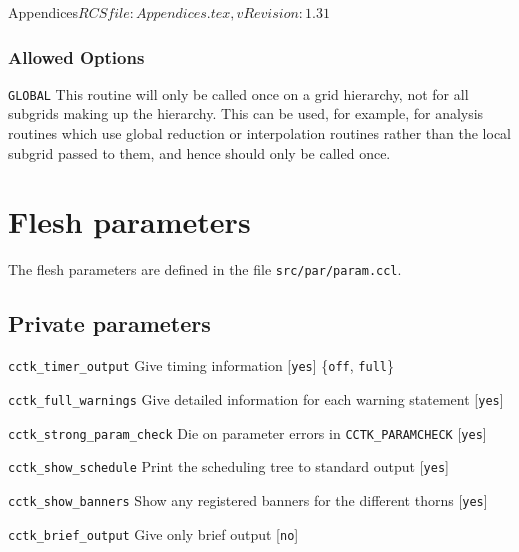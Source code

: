 \begin{cactuspart}{6}{Appendices}{$RCSfile: Appendices.tex,v $}{$Revision: 1.31 $}
\subsection{Allowed Options}

\begin{Lentry}

\item[{\tt GLOBAL}]
This routine will only be called once on a grid hierarchy, not for all
subgrids making up the hierarchy.  This can be used, for example, for
analysis routines which use global reduction or interpolation routines
rather than the local subgrid passed to them, and hence should only be
called once.

\end{Lentry}

\chapter{Flesh parameters}
\label{sec:ccpa}

The flesh parameters are defined in the file {\tt src/par/param.ccl}.

\section{Private parameters}

\begin{Lentry}



\item[{\tt cctk\_timer\_output}]
Give timing information [{\tt yes}] \{{\tt off}, {\tt full}\}

\item[{\tt cctk\_full\_warnings}]
Give detailed information for each warning statement [{\tt yes}]

\item[{\tt cctk\_strong\_param\_check}]
Die on parameter errors in {\tt CCTK\_PARAMCHECK} [{\tt yes}]

\item [{\tt cctk\_show\_schedule}]
Print the scheduling tree to standard output [{\tt yes}]

\item [{\tt cctk\_show\_banners}]
Show any registered banners for the different thorns [{\tt yes}]

\item [{\tt cctk\_brief\_output}]
Give only brief output [{\tt no}]

\end{Lentry}


\end{cactuspart}
